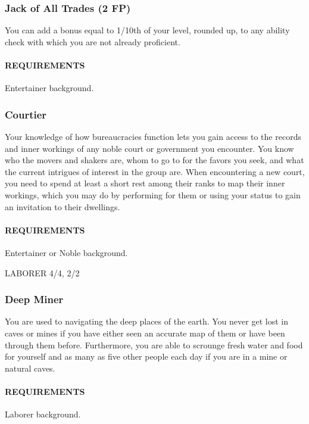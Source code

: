     \subsubsection{Jack of All Trades (2 FP)} \label{feat::jackofalltrades}
        You can add a bonus equal to 1/10th of your level, rounded up, to any ability check with which you are not already proficient.
        \paragraph{REQUIREMENTS} Entertainer background.

    \subsubsection{Courtier} \label{feat::courtier}
        Your knowledge of how bureaucracies function lets you gain access to the records and inner workings of any noble court or government you encounter.
        You know who the movers and shakers are, whom to go to for the favors you seek, and what the current intrigues of interest in the group are.
        When encountering a new court, you need to spend at least a short rest among their ranks to map their inner workings, which you may do by performing for them or using your status to gain an invitation to their dwellings.
        \paragraph{REQUIREMENTS} Entertainer or Noble background.

LABORER 4/4, 2/2
    \subsubsection{Deep Miner} \label{feat::deepminer}
        You are used to navigating the deep places of the earth.
        You never get lost in caves or mines if you have either seen an accurate map of them or have been through them before.
        Furthermore, you are able to scrounge fresh water and food for yourself and as many as five other people each day if you are in a mine or natural caves.
        \paragraph{REQUIREMENTS} Laborer background.

